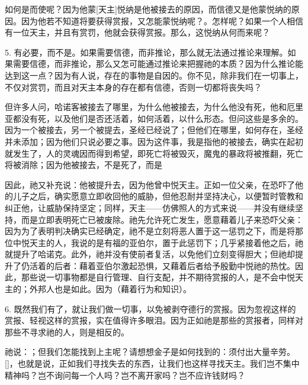 如何是而使呢？因为他蒙[天主]悦纳是他被接去的原因，而信德又是他蒙悦纳的原因。因为他若不知道将要获得赏报，又怎能蒙悦纳呢？。怎样呢？如果一个人相信有一位天主，并且有赏罚，他就会获得赏报。那么，这悦纳从何而来呢？\par

5. 有必要，而不是。如果需要信德，而非推论，那么就无法通过推论来理解。如果需要信德，而非推论，那么又怎可能通过推论来把握祂的本质？因为什么推论能达到这一点？因为有人说，存在的事物是自因的。你不见，除非我们在一切事上，不仅对赏罚，而且对天主本身的存在都有信德，否则一切都将丧失吗？\par

但许多人问，哈诺客被接去了哪里，为什么他被接去，为什么他没有死，他和厄里亚都没有死，以及他们是否还活着，如何活着，以什么形态。但问这些是多余的。因为一个被接去，另一个被提去，圣经已经说了；但他们在哪里，如何存在，圣经并未添加；因为他们只说必要之事。因为这件事，我是指他的被接去，确实在起初就发生了，人的灵魂因而得到希望，即死亡将被毁灭，魔鬼的暴政将被推翻，死亡将被消除；因为他被接去，不是死了，而是\par

因此，祂又补充说：他被提升去，因为他曾中悦天主。正如一位父亲，在恐吓了他的儿子之后，确实愿意立即收回他的威胁，但他忍耐并坚持决心，以便暂时管教和纠正他，让威胁保持坚定；同样，天主——仿佛照人的方式来说——并没有继续坚持，而是立即表明死亡已被废除。祂先允许死亡发生，愿意藉着儿子来恐吓父亲：因为为了表明判决确实已经确定，祂不是立刻将恶人置于这一惩罚之下，而是将那位中悦天主的人，我说的是有福的亚伯尔，置于此惩罚下；几乎紧接着他之后，祂就提升了哈诺克。此外，祂并没有使前者复活，以免他们立刻变得胆大；但祂却提升了仍活着的后者：藉着亚伯尔激起恐惧，又藉着后者给予殷勤中悦祂的热忱。因此，那些说一切事物都是自行管理、自行支配，并不期待赏报的人，是不会中悦天主的；外邦人也是如此。因为（藉着行为和知识）。\par

6. 既然我们有了，就让我们做一切事，以免被剥夺德行的赏报。因为忽视这样的赏报、轻视这样的赏报，实在值得许多眼泪。因为正如祂是那些的赏报者，同样对那些不寻求祂的人，则是相反的。\par

祂说：；但我们怎能找到上主呢？请想想金子是如何找到的：须付出大量辛劳。[]，也就是说，正如我们寻找失去的东西，让我们也这样寻找天主。我们岂不集中精神吗？岂不询问每一个人吗？岂不离开家吗？岂不应许钱财吗？\par

